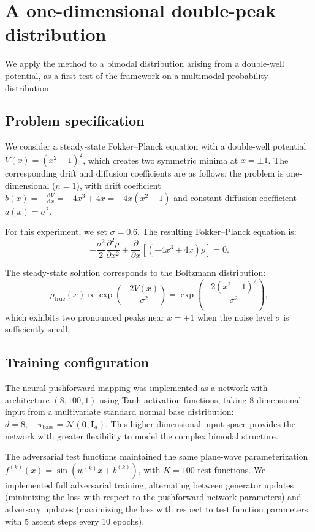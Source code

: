 \documentclass[11pt,a4paper]{article}
\renewcommand{\mathbf}[1]{\boldsymbol{#1}}
\begin{document}
\FloatBarrier
\section{A one-dimensional double-peak distribution}\label{sup:dp1d}

We apply the method to a bimodal distribution arising from a double-well potential, as a first test of the framework on a multimodal probability distribution.

\subsection{Problem specification}
We consider a steady-state Fokker--Planck equation with a double-well potential $V(x) = (x^2 - 1)^2$, which creates two symmetric minima at $x = \pm 1$. The corresponding drift and diffusion coefficients are as follows: the problem is one-dimensional ($n=1$), with drift coefficient $b(x) = -\frac{\mathrm{d}V}{\mathrm{d}x} = -4x^3 + 4x = -4x(x^2 - 1)$ and constant diffusion coefficient $a(x) = \sigma^2$.

For this experiment, we set $\sigma = 0.6$. The resulting Fokker--Planck equation is:
\begin{equation}
-\frac{\sigma^2}{2} \frac{\partial^2 \rho}{\partial x^2} + \frac{\partial}{\partial x}[(-4x^3 + 4x) \rho] = 0.
\end{equation}

The steady-state solution corresponds to the Boltzmann distribution:
\begin{equation}
\rho_{\text{true}}(x) \propto \exp\left(-\frac{2V(x)}{\sigma^2}\right) = \exp\left(-\frac{2(x^2-1)^2}{\sigma^2}\right),
\end{equation}
which exhibits two pronounced peaks near $x = \pm 1$ when the noise level $\sigma$ is sufficiently small.

\subsection{Training configuration}
The neural pushforward mapping was implemented as a network with architecture $(8, 100, 1)$ using Tanh activation functions, taking 8-di\-men\-sional input from a multivariate standard normal base distribution:
$
d = 8,\quad \pi_{\text{base}} = \mathcal{N}(\mathbf{0}, \mathbf{I}_d).
$
This higher-dimensional input space provides the network with greater flexibility to model the complex bimodal structure.

The adversarial test functions maintained the same plane-wave parameterization $f^{(k)}(x) = \sin(w^{(k)} x + b^{(k)})$, with $K = 100$ test functions. We implemented full adversarial training, alternating between generator updates (minimizing the loss with respect to the pushforward network parameters) and adversary updates (maximizing the loss with respect to test function parameters, with 5 ascent steps every 10 epochs).
\end{document}
